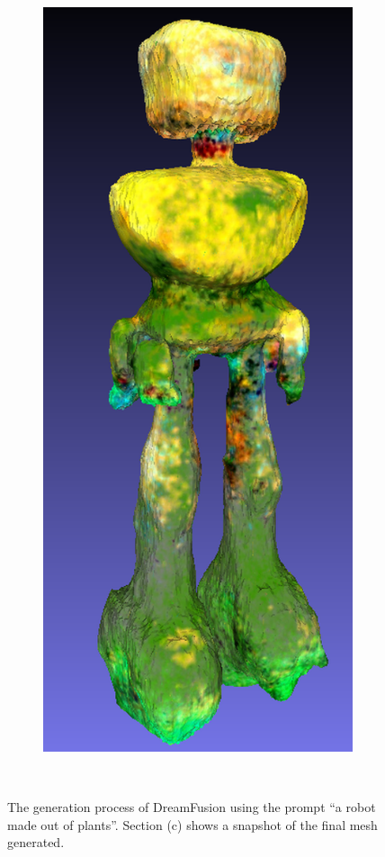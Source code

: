 \begin{figure}[H]
\begin{subfigure}[b]{0.20\textwidth}
        \caption{}
    \end{subfigure}
    \hspace{.5cm}
    \begin{subfigure}[b]{0.252\textwidth}
        \centering
        \includegraphics[width=\textwidth]{figures/generationProcess/dreamfusion_plantrobot_model_resized.png}
        \caption{}
    \end{subfigure}
    \caption{The generation process of DreamFusion using the prompt ``a robot made out of plants''. Section (c) shows a snapshot of the final mesh generated.}~\label{fig:generationDreamFusion}
\end{figure}

